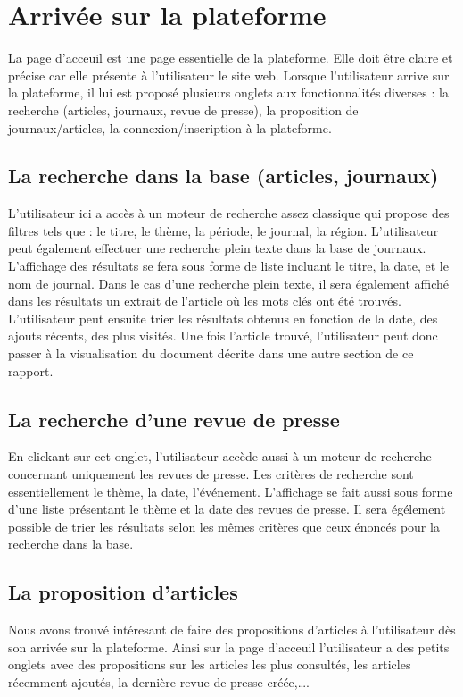 \section{Arrivée sur la plateforme}
\label{sec:arrivee}

La page d’acceuil est une page essentielle de la plateforme. Elle doit être claire et précise car elle présente à l’utilisateur le site web.
Lorsque l’utilisateur arrive sur la plateforme, il lui est proposé plusieurs onglets aux fonctionnalités diverses : la recherche (articles, journaux, revue de presse), la proposition de journaux/articles, la connexion/inscription à la plateforme.

\subsection{La recherche dans la base (articles, journaux)}
\label{sec:arrivee_recherche}
L’utilisateur ici a accès à un moteur de recherche assez classique qui propose des filtres tels que : le titre, le thème, la période, le journal, la région. L’utilisateur peut également effectuer une recherche plein texte dans la base de journaux. L’affichage des résultats se fera sous forme de liste incluant le titre, la date, et le nom de journal. Dans le cas d’une recherche plein texte, il sera également affiché dans les résultats un extrait de l’article où les mots clés ont été trouvés. L’utilisateur peut ensuite trier les résultats obtenus en fonction de la date, des ajouts récents, des plus visités. Une fois l’article trouvé, l’utilisateur peut donc passer à la visualisation du document décrite dans une autre section de ce rapport.

\subsection{La recherche d’une revue de presse}
\label{sec:arrivee_revue}
En clickant sur cet onglet, l’utilisateur accède aussi à un moteur de recherche concernant uniquement les revues de presse. Les critères de recherche sont essentiellement le thème, la date, l’événement. L’affichage se fait aussi sous forme d’une liste présentant le thème et la date des revues de presse. Il sera égélement possible de trier les résultats selon les mêmes critères que ceux énoncés pour la recherche dans la base.

\subsection{La proposition d’articles}
\label{sec:arrivee_article}
Nous avons trouvé intéresant de faire des propositions d’articles à l’utilisateur dès son arrivée sur la plateforme. Ainsi sur la page d’acceuil l’utilisateur a des petits onglets avec des propositions sur les articles les plus consultés, les articles récemment ajoutés, la dernière revue de presse créée,….

